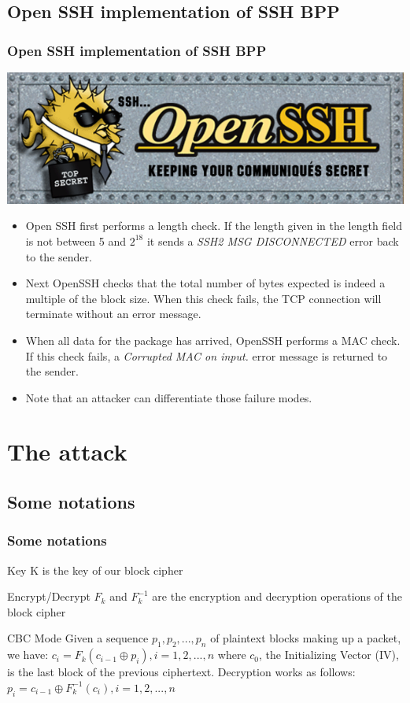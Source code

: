 \documentclass[fleqn]{beamer}
\begin{document}
\subsection{Open SSH implementation of SSH BPP}
    \begin{frame}
  \frametitle{Open SSH implementation of SSH BPP}
\begin{center}
  \includegraphics[scale=.2]{openssh.pdf}
\end{center}
    \begin{itemize}
      \item Open SSH first performs a length check. If the length given in the length field is not between 5 and $2^{18}$ it sends a \textit{SSH2 MSG DISCONNECTED} error back to the sender.
      \item Next OpenSSH checks that the total number of bytes expected is indeed a multiple of the block size. When this check fails, the TCP connection will terminate without an error message.
      \item When all data for the package has arrived, OpenSSH performs a MAC check. If this check fails, a \textit{Corrupted MAC on input.} error message is returned to the sender.
      \item Note that an attacker can differentiate those failure modes.
    \end{itemize}
  \end{frame}

\section{The attack}

\subsection{Some notations}

   \begin{frame}
    \frametitle{Some notations}
    \begin{block}{Key}
	    K is the key of our block cipher
    \end{block}
     \begin{block}{Encrypt/Decrypt}
	    $F_k$ and $F^{-1}_k$ are the encryption and decryption operations of the block cipher
    \end{block}
         \begin{block}{CBC Mode}
	    Given a sequence $p_1,p_2,...,p_n$ of plaintext blocks making up a packet, we have: 
$c_i = F_k(c_{i-1} \oplus p_i), i = 1,2,...,n$
where $c_0$, the Initializing Vector (IV), is the last block of the previous ciphertext. Decryption works as follows: $p_i = c_{i-1} \oplus F^{-1}_k(c_i), i = 1,2,...,n$
    \end{block}
  \end{frame}
\end{document}
